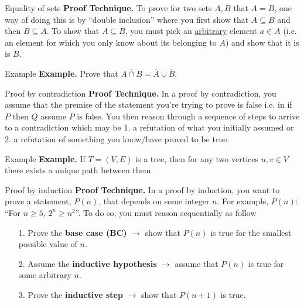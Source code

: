 \documentclass[10pt]{beamer}
\begin{document}
\begin{frame}{Equality of sets}
    \textbf{Proof Technique.} To prove for two sets $A, B$ that $A = B$, one way of doing this is by ``double inclusion'' where you first show that $A \subseteq B$ and then $B \subseteq A$. To show that $A \subseteq B$, you must pick an \underline{arbitrary} element $a \in A$ (i.e. an element for which you only know about its belonging to $A$) and show that it is is $B$.
\end{frame}

\begin{frame}[t]{Example}
    \textbf{Example.} Prove that $\overline{A \cap B} = \overline{A} \cup \overline{B}$.
\end{frame}

\begin{frame}{Proof by contradiction}
    \textbf{Proof Technique.} In a proof by contradiction, you assume that the premise of the statement you're trying to prove is false i.e. in if $P$ then $Q$ assume $P$ is false. You then reason through a sequence of steps to arrive to a contradiction which may be 1. a refutation of what you initially assumed or 2. a refutation of something you know/have proved to be true.
\end{frame}

\begin{frame}[t]{Example}
    \textbf{Example.} If $T = (V, E)$ is a tree, then for any two vertices $u, v \in V$ there exists a unique path between them.
\end{frame}

\begin{frame}{Proof by induction}
    \textbf{Proof Technique.} In a proof by induction, you want to prove a statement, $P(n)$, that depends on some integer $n$. For example, $P(n): $ ``For $n \geq 5$, $2^n \geq n^2$''. To do so, you must reason sequentially as follow
    \begin{itemize}
        \item[1.] Prove the \textbf{base case (BC)} $\rightarrow$ show that $P(n)$ is true for the smallest possible value of $n$.
        \item[2.] Assume the \textbf{inductive hypothesis} $\rightarrow$ assume that $P(n)$ is true for some arbitrary $n$.
        \item[3.] Prove the \textbf{inductive step} $\rightarrow$ show that $P(n+1)$ is true.
    \end{itemize}
\end{frame}
\end{document}
